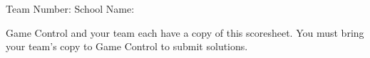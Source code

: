 \vspace{1em}

{\noindent\LARGE Team Number: \underline{\hspace{0.5in}}
School Name: \underline{\hspace{3in}}}

{\footnotesize\noindent
Game Control and your team each have a copy of this scoresheet. You must
bring your team's copy to Game Control to submit solutions.}


